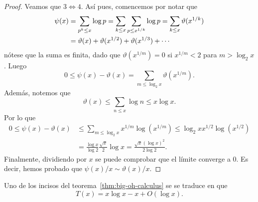 \documentclass[teoria-numeros.tex]{subfiles}
\begin{document}
\begin{proof}
	Veamos que $3 \iff 4$.
	Así pues, comencemos por notar que
	\begin{align}
		\psi(x) &= \sum_{p^k \le x} \log p = \sum_{k\le x}\sum_{p \le x^{1/k}} \log p = \sum_{k\le x} \vartheta(x^{1/k}) \notag \\
		&= \vartheta(x) + \vartheta(x^{1/2}) + \vartheta(x^{1/3}) + \cdots \label{eq:psi_theta_formula}
	\end{align}
	nótese que la suma es finita, dado que $\vartheta(x^{1/m}) = 0$ si $x^{1/m} < 2$ para $m > \log_2 x$.
	Luego
	$$ 0 \le \psi(x) - \vartheta(x) = \sum_{m \le \log_2 x} \vartheta(x^{1/m}). $$
	Además, notemos que
	$$ \vartheta(x) \le \sum_{n \le x} \log n \le x\log x. $$
	Por lo que
	\begin{align*}
		0 \le \psi(x) - \vartheta(x) &\le \sum_{m \le \log_2 x} x^{1/m} \log(x^{1/m}) \le \log_2 x x^{1/2} \log(x^{1/2}) \\
		&= \frac{\log x}{\log 2} \frac{\sqrt{x}}{2} \log x = \frac{\sqrt{x} (\log x)^2}{2\log 2}.
	\end{align*}
	Finalmente, dividiendo por $x$ se puede comprobar que el límite converge a 0.
	Es decir, hemos probado que $ \psi(x)/x \sim \vartheta(x)/x $.
\end{proof}

Uno de los incisos del teorema~\ref{thm:big-oh-calculus} se se traduce en que
\begin{equation}\label{eq:log_sum_approx}
	T(x) = x\log x - x + O(\log x).
\end{equation}
\end{document}
